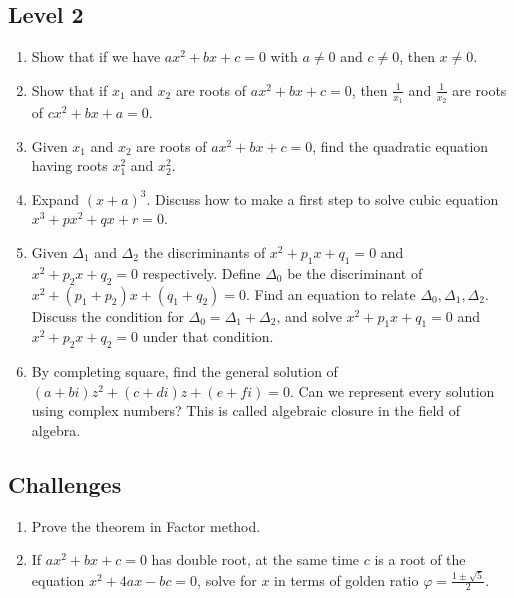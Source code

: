 \documentclass[12pt]{article}
\begin{document}
    \subsection*{Level 2}
    \begin{enumerate}
        \item Show that if we have $ax^2+bx+c=0$ with $a\neq 0$ and $c\neq 0$, then $x\neq 0$.
        \item Show that if $x_1$ and $x_2$ are roots of $ax^2+bx+c=0$, then $\frac{1}{x_1}$ and $\frac{1}{x_2}$ are roots of $cx^2+bx+a=0$.
        \item Given $x_1$ and $x_2$ are roots of $ax^2+bx+c=0$, find the quadratic equation having roots $x_1^2$ and $x_2^2$.
        \item Expand $(x+a)^3$. Discuss how to make a first step to solve cubic equation $x^3+px^2+qx+r=0$.
        \item Given $\Delta_1$ and $\Delta_2$ the discriminants of $x^2+p_1x+q_1=0$ and $x^2+p_2x+q_2=0$ respectively. Define $\Delta_0$ be the discriminant of $x^2+(p_1+p_2)x+(q_1+q_2)=0$. Find an equation to relate $\Delta_0,\Delta_1,\Delta_2$. Discuss the condition for $\Delta_0=\Delta_1+\Delta_2$, and solve $x^2+p_1x+q_1=0$ and $x^2+p_2x+q_2=0$ under that condition.
        \item By completing square, find the general solution of $(a+bi)z^2+(c+di)z+(e+fi)=0$. Can we represent every solution using complex numbers? This is called algebraic closure in the field of algebra.
    \end{enumerate}

    \subsection*{Challenges}
    \begin{enumerate}
        \item Prove the theorem in Factor method.
        \item If $ax^2+bx+c=0$ has double root, at the same time $c$ is a root of the equation $x^2+4ax-bc=0$, solve for $x$ in terms of golden ratio $\varphi=\frac{1\pm\sqrt{5}}{2}$. 
    \end{enumerate}
\end{document}
